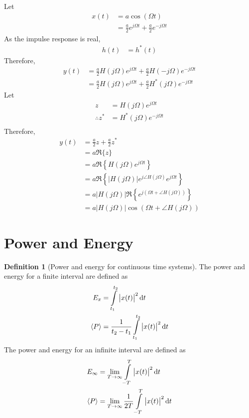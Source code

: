 \documentclass[titlepage, fleqn, a4paper, 12pt, twoside]{article}
\theoremstyle{definition}
\newtheorem{definition}{Definition}
\theoremstyle{theorem}
\begin{document}
Let
\begin{align*}
	x(t) &= a \cos(\Omega t)\\
	&= \frac{a}{2} e^{j \Omega t} + \frac{a}{2} e^{-j \Omega t}
\end{align*}
As the impulse response is real,
\begin{align*}
	h(t) &= h^*(t)
\end{align*}
Therefore,
\begin{align*}
	y(t) &= \frac{a}{2} H(j \Omega) e^{j \Omega t} + \frac{a}{2} H(-j \Omega) e^{-j \Omega t}\\
	&= \frac{a}{2} H(j \Omega) e^{j \Omega t} + \frac{a}{2} H^*(j \Omega) e^{-j \Omega t}
\end{align*}
Let
\begin{align*}
	z &= H(j \Omega) e^{j \Omega t}\\
	\therefore z^* &= H^*(j \Omega) e^{-j \Omega t}\\
\end{align*}
Therefore,
\begin{align*}
	y(t) &= \frac{a}{2} z + \frac{a}{2} z^*\\
	&= a \Re\{z\}\\
	&= a \Re\left\{ H(j \Omega) e^{j \Omega t} \right\}\\
	&= a \Re\left\{ \left| H(j \Omega) \right| e^{j \angle H(j \Omega)} e^{j \Omega t} \right\}\\
	&= a \left| H(j \Omega) \right| \Re\left\{ e^{j \left( \Omega t + \angle H(j \Omega) \right)} \right\}\\
	&= a \left| H(j \Omega) \right| \cos\left( \Omega t + \angle H(j \Omega) \right)
\end{align*}

\section{Power and Energy}

\begin{definition}[Power and energy for continuous time systems]
	The power and energy for a finite interval are defined as
	\begin{align*}
		E_x &= \int\limits_{t_1}^{t_2} \left| x(t) \right|^2 \dif t\\
		\langle P \rangle &= \frac{1}{t_2 - t_1} \int\limits_{t_1}^{t_2} \left| x(t) \right|^2 \dif t
	\end{align*}
	The power and energy for an infinite interval are defined as
	\begin{align*}
		E_{\infty} &= \lim\limits_{T \to \infty} \int\limits_{-T}^{T} \left| x(t) \right|^2 \dif t\\
		\langle P \rangle &= \lim\limits_{T \to \infty} \frac{1}{2 T} \int\limits_{-T}^{T} \left| x(t) \right|^2 \dif t
	\end{align*}
\end{definition}
\end{document}
